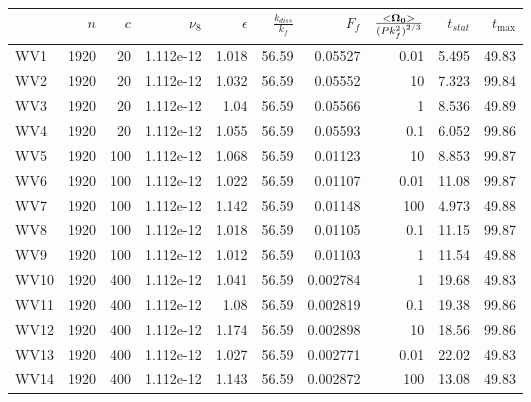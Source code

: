 \documentclass[a4paper]{article}
\begin{document}
\begin{tabular}{lrrrrrrrrr}
\toprule
{} &   $n$ &  $c$ &   $\nu_8$ &  $\epsilon$ &  $\frac{k_{diss}}{k_f}$ &    $F_f$ &  $\frac{<\bf \Omega_0 >}{{(P k_f^2)}^{2/3}}$ &  $t_{stat}$ &  $t_{\max}$ \\
\midrule
WV1  &  1920 &   20 & 1.112e-12 &       1.018 &                   56.59 &  0.05527 &                                         0.01 &       5.495 &       49.83 \\
WV2  &  1920 &   20 & 1.112e-12 &       1.032 &                   56.59 &  0.05552 &                                           10 &       7.323 &       99.84 \\
WV3  &  1920 &   20 & 1.112e-12 &        1.04 &                   56.59 &  0.05566 &                                            1 &       8.536 &       49.89 \\
WV4  &  1920 &   20 & 1.112e-12 &       1.055 &                   56.59 &  0.05593 &                                          0.1 &       6.052 &       99.86 \\
WV5  &  1920 &  100 & 1.112e-12 &       1.068 &                   56.59 &  0.01123 &                                           10 &       8.853 &       99.87 \\
WV6  &  1920 &  100 & 1.112e-12 &       1.022 &                   56.59 &  0.01107 &                                         0.01 &       11.08 &       99.87 \\
WV7  &  1920 &  100 & 1.112e-12 &       1.142 &                   56.59 &  0.01148 &                                          100 &       4.973 &       49.88 \\
WV8  &  1920 &  100 & 1.112e-12 &       1.018 &                   56.59 &  0.01105 &                                          0.1 &       11.15 &       99.87 \\
WV9  &  1920 &  100 & 1.112e-12 &       1.012 &                   56.59 &  0.01103 &                                            1 &       11.54 &       49.88 \\
WV10 &  1920 &  400 & 1.112e-12 &       1.041 &                   56.59 & 0.002784 &                                            1 &       19.68 &       49.83 \\
WV11 &  1920 &  400 & 1.112e-12 &        1.08 &                   56.59 & 0.002819 &                                          0.1 &       19.38 &       99.86 \\
WV12 &  1920 &  400 & 1.112e-12 &       1.174 &                   56.59 & 0.002898 &                                           10 &       18.56 &       99.86 \\
WV13 &  1920 &  400 & 1.112e-12 &       1.027 &                   56.59 & 0.002771 &                                         0.01 &       22.02 &       49.83 \\
WV14 &  1920 &  400 & 1.112e-12 &       1.143 &                   56.59 & 0.002872 &                                          100 &       13.08 &       49.83 \\
\bottomrule
\end{tabular}
\end{document}
